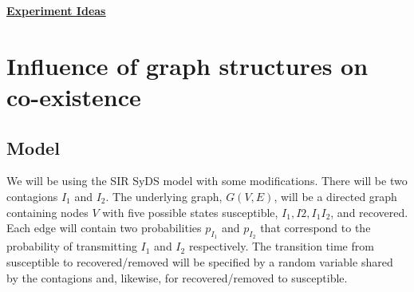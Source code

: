 \documentclass[11pt]{article}
\begin{document}
\newtheorem{theorem}{Theorem}[section]
\newtheorem{lemma}{Lemma}[section]
\newtheorem{corollary}{Corollary}[section]
\newtheorem{fact}{Fact}[section]
\newtheorem{definition}{Definition}[section]
\newtheorem{proposition}{Proposition}[section]
\newtheorem{observation}{Observation}[section]
\newtheorem{claim}{Claim}[section]

\newcommand{\cnp}{\textbf{NP}}
\newcommand{\true}{\texttt{True}}
\newcommand{\false}{\texttt{False}}

\newcommand{\QED}{\hfill\rule{2mm}{2mm}}

\newcommand{\irange}{\mbox{$1 \leq i \leq n$}}
\newcommand{\jrange}{\mbox{$1 \leq j \leq m$}}

\newcommand{\dunder}[1]{\underline{\underline{#1}}}

\setlength{\parskip}{3pt}

\normalbaselineskip

\begin{center}
\dunder{\Large{\textbf{Experiment Ideas}}}
\end{center}

\medskip
\section{Influence of graph structures on co-existence} 
\subsection{Model}
    We will be using the SIR SyDS model with some modifications. There will be two
    contagions $I_{1}$ and $I_{2}$. The underlying graph, $G(V,E)$, will be a directed graph
    containing nodes $V$ with five possible states susceptible, $I_{1}, I{2}, I_{1}I_{2}$, and recovered. Each edge will contain 
    two probabilities $p_{I_{1}}$ and $p_{I_{2}}$ that correspond to the probability of transmitting $I_{1}$ and $I_{2}$ respectively. 
    The transition time from susceptible to recovered/removed will be specified by a random variable shared by the contagions and, likewise, for recovered/removed to susceptible. 
\end{document}
